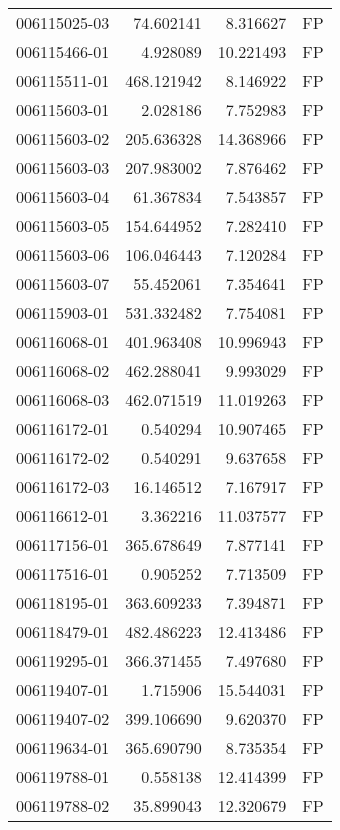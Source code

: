 \begin{tabular}{lrrl}
006115025-03 &   74.602141 &       8.316627 &   FP \\
006115466-01 &    4.928089 &      10.221493 &   FP \\
006115511-01 &  468.121942 &       8.146922 &   FP \\
006115603-01 &    2.028186 &       7.752983 &   FP \\
006115603-02 &  205.636328 &      14.368966 &   FP \\
006115603-03 &  207.983002 &       7.876462 &   FP \\
006115603-04 &   61.367834 &       7.543857 &   FP \\
006115603-05 &  154.644952 &       7.282410 &   FP \\
006115603-06 &  106.046443 &       7.120284 &   FP \\
006115603-07 &   55.452061 &       7.354641 &   FP \\
006115903-01 &  531.332482 &       7.754081 &   FP \\
006116068-01 &  401.963408 &      10.996943 &   FP \\
006116068-02 &  462.288041 &       9.993029 &   FP \\
006116068-03 &  462.071519 &      11.019263 &   FP \\
006116172-01 &    0.540294 &      10.907465 &   FP \\
006116172-02 &    0.540291 &       9.637658 &   FP \\
006116172-03 &   16.146512 &       7.167917 &   FP \\
006116612-01 &    3.362216 &      11.037577 &   FP \\
006117156-01 &  365.678649 &       7.877141 &   FP \\
006117516-01 &    0.905252 &       7.713509 &   FP \\
006118195-01 &  363.609233 &       7.394871 &   FP \\
006118479-01 &  482.486223 &      12.413486 &   FP \\
006119295-01 &  366.371455 &       7.497680 &   FP \\
006119407-01 &    1.715906 &      15.544031 &   FP \\
006119407-02 &  399.106690 &       9.620370 &   FP \\
006119634-01 &  365.690790 &       8.735354 &   FP \\
006119788-01 &    0.558138 &      12.414399 &   FP \\
006119788-02 &   35.899043 &      12.320679 &   FP \\

\end{tabular}
